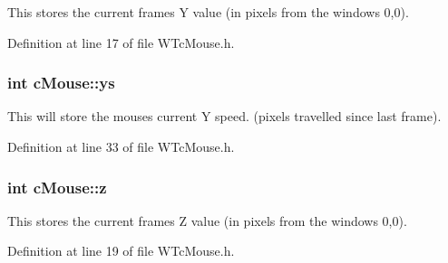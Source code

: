 This stores the current frames Y value (in pixels from the windows 0,0). 



Definition at line 17 of file WTcMouse.h.

\hypertarget{classc_mouse_a5747de760c63d410eac682dd9fad506f}{
\subsubsection[{ys}]{\setlength{\rightskip}{0pt plus 5cm}int {\bf cMouse::ys}}}
\label{classc_mouse_a5747de760c63d410eac682dd9fad506f}


This will store the mouses current Y speed. (pixels travelled since last frame). 



Definition at line 33 of file WTcMouse.h.

\hypertarget{classc_mouse_abd2eb43958c968e29bc01351ca6c82f7}{
\subsubsection[{z}]{\setlength{\rightskip}{0pt plus 5cm}int {\bf cMouse::z}}}
\label{classc_mouse_abd2eb43958c968e29bc01351ca6c82f7}


This stores the current frames Z value (in pixels from the windows 0,0). 



Definition at line 19 of file WTcMouse.h.

